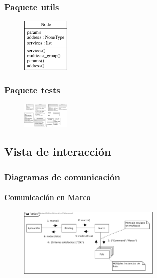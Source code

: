 \documentclass{article}
\begin{document}
\subsubsection{Paquete utils}

\begin{figure}[H]
\centering
\includegraphics[width=0.2\textwidth]{class_node}
\end{figure}

\subsubsection{Paquete tests}

\begin{figure}[H]
\centering
\includegraphics[width=0.2\textwidth]{classes_test}
\end{figure}

\subsection{Vista de interacción}

\subsubsection{Diagramas de comunicación}

\paragraph{Comunicación en Marco}

\begin{figure}[H]
\centering
\includegraphics[width=0.6\textwidth]{Marco}
\end{figure}
\end{document}
